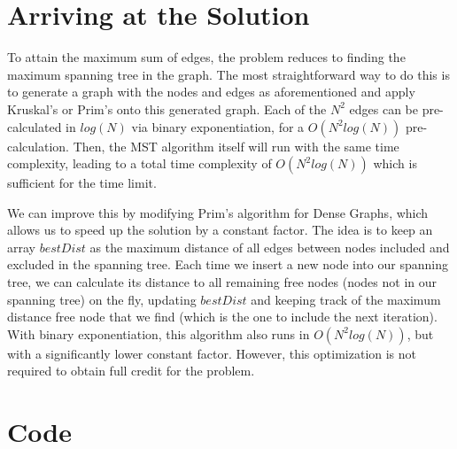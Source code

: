 \documentclass[15pt]{article}
\begin{document}
\section{Arriving at the Solution}

To attain the maximum sum of edges, the problem reduces to finding the maximum spanning tree in the graph. The most straightforward way to do this is to generate a graph with the nodes and edges as aforementioned and apply Kruskal's or Prim's onto this generated graph. Each of the $N^2$ edges can be pre-calculated in $log(N)$ via binary exponentiation, for a $O(N^2 log(N))$ pre-calculation. Then, the MST algorithm itself will run with the same time complexity, leading to a total time complexity of $O(N^2 log(N))$ which is sufficient for the time limit.

We can improve this by modifying Prim's algorithm for Dense Graphs, which allows us to speed up the solution by a constant factor. The idea is to keep an array $bestDist$ as the maximum distance of all edges between nodes included and excluded in the spanning tree. Each time we insert a new node into our spanning tree, we can calculate its distance to all remaining free nodes (nodes not in our spanning tree) on the fly, updating $bestDist$ and keeping track of the maximum distance free node that we find (which is the one to include the next iteration). With binary exponentiation, this algorithm also runs in $O(N^2 log(N))$, but with a significantly lower constant factor. However, this optimization is not required to obtain full credit for the problem.

\section{Code}
\end{document}
